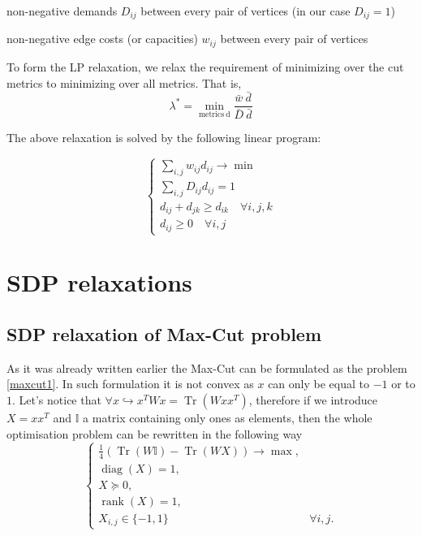 \documentclass[12pt]{article}
\DeclareMathOperator{\trace}{Tr}
\DeclareMathOperator{\diag}{diag}
\DeclareMathOperator{\rank}{rank}
\begin{document}
non-negative demands $D_{ij}$ between every pair of vertices (in our case $D_{ij} = 1$)

non-negative edge costs (or capacities) $w_{ij}$ between every pair of vertices

To form the LP relaxation, we relax the requirement of minimizing over the cut metrics to 
minimizing
over all metrics. That is,
\begin{equation}
\lambda^*= \min\limits_{\mathrm{metrics} \ \mathrm{d}} \frac{\bar{w} \ \bar{d}} {\bar{D} 
	\ \bar{d}} 
\end{equation}

The above relaxation is solved by the following linear program:

\begin{equation}
\begin{cases}
\sum\limits_{i,j} w_{ij} d_{ij} \longrightarrow \min \\
\sum\limits_{i,j} D_{ij} d_{ij} = 1\\
d_{ij} + d_{jk} \ge d_{ik} \quad \forall i,j,k\\
d_{ij} \ge 0 \quad \forall i,j
\end{cases}
\end{equation}



\section{SDP relaxations}

\subsection{SDP relaxation of Max-Cut problem}

As it was already written earlier the Max-Cut can be formulated as the problem 
\ref{maxcut1}. In such formulation it is not convex as $x$ can only be equal to $-1$ or to 
$1$. Let's notice that $\forall x \hookrightarrow x^TWx = \trace (W xx^T) $, therefore if we 
introduce $X = xx^T$ and $\mathbb{I}$ a matrix containing only ones as elements, then 
the whole optimisation problem can be rewritten in the following way
\[
\begin{cases}
\frac 14 \left(\trace(W \mathbb{I}) - \trace(W X)\right) \longrightarrow \max,  &\\
\diag(X) = 1, &\\
X \succeq 0, &\\
\rank(X) = 1,  &\\
X_{i,j} \in \{-1,1\} & \forall i, j.
\end{cases}
\]
\end{document}
